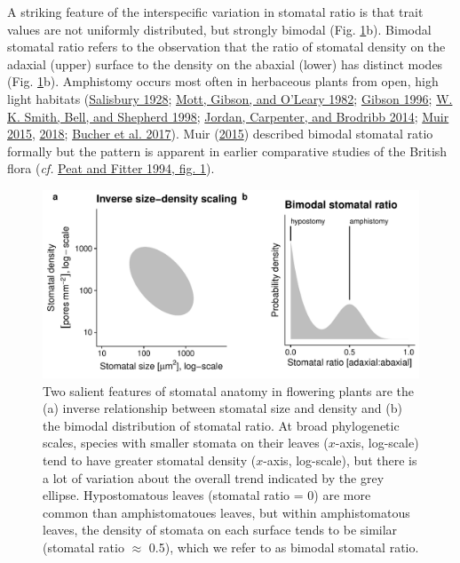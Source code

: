 \documentclass[
  12pt,
]{article}
\begin{document}
A striking feature of the interspecific variation in stomatal ratio is that trait values are not uniformly distributed, but strongly bimodal (Fig. \ref{fig:concepts}b). Bimodal stomatal ratio refers to the observation that the ratio of stomatal density on the adaxial (upper) surface to the density on the abaxial (lower) has distinct modes (Fig. \ref{fig:concepts}b). Amphistomy occurs most often in herbaceous plants from open, high light habitats (\protect\hyperlink{ref-salisbury_i_1928}{Salisbury 1928}; \protect\hyperlink{ref-mott_adaptive_1982}{Mott, Gibson, and O'Leary 1982}; \protect\hyperlink{ref-gibson_structure-function_1996}{Gibson 1996}; \protect\hyperlink{ref-smith_associations_1998}{W. K. Smith, Bell, and Shepherd 1998}; \protect\hyperlink{ref-jordan_using_2014}{Jordan, Carpenter, and Brodribb 2014}; \protect\hyperlink{ref-muir_making_2015}{Muir 2015}, \protect\hyperlink{ref-muir_light_2018}{2018}; \protect\hyperlink{ref-bucher_stomatal_2017}{Bucher et al. 2017}). Muir (\protect\hyperlink{ref-muir_making_2015}{2015}) described bimodal stomatal ratio formally but the pattern is apparent in earlier comparative studies of the British flora (\emph{cf.} \protect\hyperlink{ref-peat_comparative_1994}{Peat and Fitter 1994, fig. 1}).

\begin{figure}[ht]
\includegraphics[width=\textwidth]{../figures/concepts.pdf}
\caption{Two salient features of stomatal anatomy in flowering plants are the (a) inverse relationship between stomatal size and density and (b) the bimodal distribution of stomatal ratio. At broad phylogenetic scales, species with smaller stomata on their leaves ($x$-axis, log-scale) tend to have greater stomatal density  ($x$-axis, log-scale), but there is a lot of variation about the overall trend indicated by the grey ellipse. Hypostomatous leaves (stomatal ratio = 0) are more common than amphistomatoues leaves, but within amphistomatous leaves, the density of stomata on each surface tends to be similar (stomatal ratio $\approx$ 0.5), which we refer to as bimodal stomatal ratio.}
\label{fig:concepts}
\end{figure}
\end{document}
